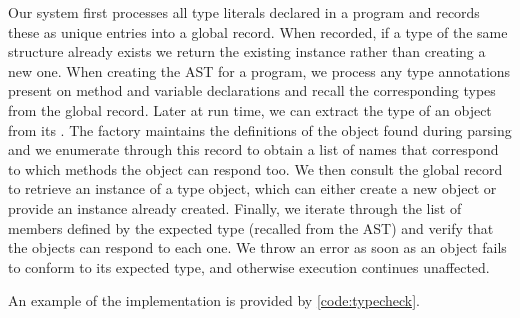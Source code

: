 
Our system first processes all type literals declared in a program and records these as
unique entries into a global record.
When recorded, if a type of the same structure already exists we return the existing instance
rather than creating a new one.
When creating the AST for a program, 
we process any type annotations present on method and variable declarations and
recall the corresponding types from the global record. 
Later at run time, we can extract the type of an object from its .
The factory maintains the definitions of the object found during parsing and
we enumerate through this record to obtain a list of names that correspond
to which methods the object can respond too.
We then consult the global record to retrieve an instance of a type object,
which can either create a new object or provide an instance already created.
Finally, we iterate through the list of members defined by the expected type 
(recalled from the AST) and verify that the objects can respond to each one.
We throw an error as soon as an object fails to conform to its expected type, 
and otherwise execution continues unaffected.

An example of the implementation is provided by \cref{code:typecheck}.







